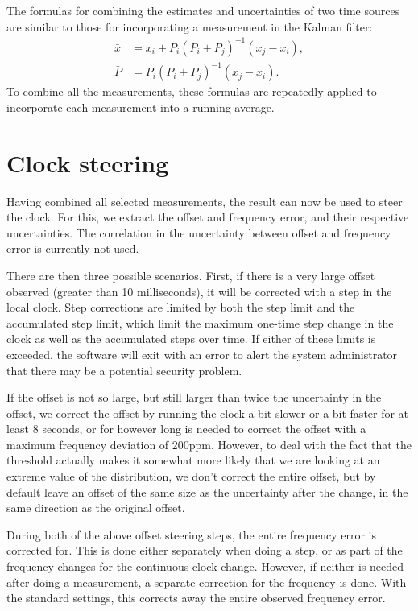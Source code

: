 \documentclass{article}
\begin{document}
The formulas for combining the estimates and uncertainties of two time sources are similar to those for incorporating a measurement in the Kalman filter:
\begin{align}
\bar{x} &= x_i + P_i(P_i+P_j)^{-1}(x_j - x_i),\\
\bar{P} &= P_i(P_i+P_j)^{-1}(x_j - x_i).
\end{align}
To combine all the measurements, these formulas are repeatedly applied to incorporate each measurement into a running average.

\section{Clock steering}\label{sec:steering}

Having combined all selected measurements, the result can now be used to steer the clock.
For this, we extract the offset and frequency error, and their respective uncertainties.
The correlation in the uncertainty between offset and frequency error is currently not used.

There are then three possible scenarios. First, if there is a very large offset observed (greater than 10 milliseconds), 
it will be corrected with a step in the local clock.
Step corrections are limited by both the step limit and the accumulated step limit, which limit the maximum one-time step change in the clock as well
as the accumulated steps over time. If either of these limits is exceeded, the software will exit with an error to alert the system administrator
that there may be a potential security problem.

If the offset is not so large, but still larger than twice the uncertainty in the offset, we correct the offset by running the clock a bit slower or a bit
faster for at least 8 seconds, or for however long is needed to correct the offset with a maximum frequency deviation of 200ppm. However, to deal with
the fact that the threshold actually makes it somewhat more likely that we are looking at an extreme value of the distribution, we don't correct the entire
offset, but by default leave an offset of the same size as the uncertainty after the change, in the same direction as the original offset.

During both of the above offset steering steps, the entire frequency error is corrected for. This is done either separately when doing a step, or as part
of the frequency changes for the continuous clock change. However, if neither is needed after doing a measurement, a separate correction for the frequency
is done. With the standard settings, this corrects away the entire observed frequency error.
\end{document}
